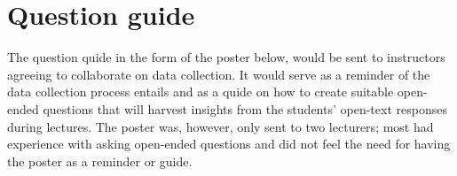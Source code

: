 \chapter{Question guide}\label{app:question-guide}

The question quide in the form of the poster below, would be sent to instructors agreeing to collaborate on data collection. It would serve as a reminder of the data collection process entails and as a quide on how to create suitable open-ended questions that will harvest insights from the students' open-text responses during lectures. The poster was, however, only sent to two lecturers; most had experience with asking open-ended questions and did not feel the need for having the poster as a reminder or guide.

